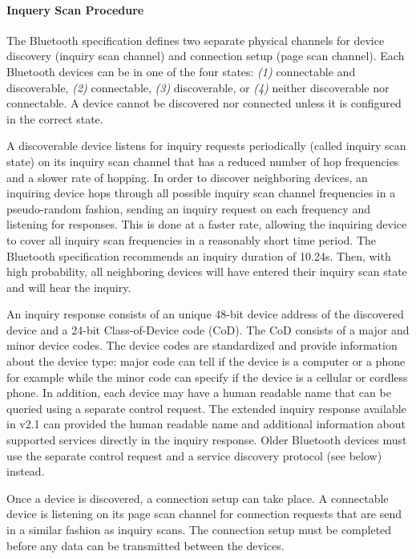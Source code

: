\paragraph*{Inquery Scan Procedure}

The Bluetooth specification defines two separate physical channels for device discovery (inquiry scan channel) and connection setup (page scan channel).  Each Bluetooth devices can be in one of the four states: \emph{(1)} connectable and discoverable, \emph{(2)} connectable, \emph{(3)} discoverable, or \emph{(4)} neither discoverable nor connectable. A device cannot be discovered nor connected unless it is configured in the correct state.

A discoverable device listens for inquiry requests periodically (called inquiry scan state) on its inquiry scan channel that has a reduced number of hop frequencies and a slower rate of hopping. In order to discover neighboring devices, an inquiring device hops through all possible inquiry scan channel frequencies in a pseudo-random fashion, sending an inquiry request on each frequency and listening for responses. This is done at a faster rate, allowing the inquiring device to cover all inquiry scan frequencies in a reasonably short time period. The Bluetooth specification recommends an inquiry duration of 10.24s. Then, with high probability, all neighboring devices will
have entered their inquiry scan state and will hear the inquiry.

An inquiry response consists of an unique 48-bit device address of the discovered device and a 24-bit Class-of-Device code (CoD). The CoD consists of a major and minor device codes. The device codes are standardized and provide information about the device type: major code can tell if the device is a computer or a phone for example while the minor code can specify if the device is a cellular or cordless phone. In addition, each device may have a human readable name that can be queried using a separate control request. The extended inquiry response available in v2.1 can provided the human readable name and additional information about supported services directly in the inquiry response. Older Bluetooth devices must use the separate control request and a service discovery protocol (see below) instead.

Once a device is discovered, a connection setup can take place. A connectable device is listening on its page scan channel for connection requests that are send in a similar fashion as inquiry scans. The connection setup must be completed before any data can be transmitted between the devices.

